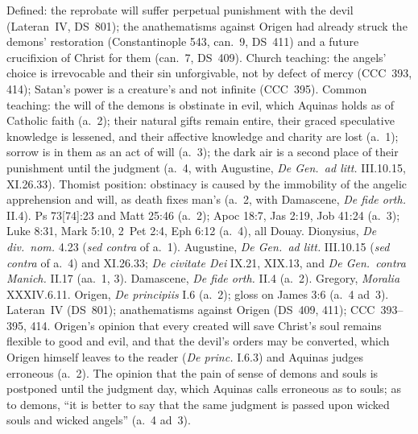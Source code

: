  {Defined: the reprobate will suffer perpetual punishment with the devil
 (Lateran~IV, DS~801); the anathematisms against Origen had already
 struck the demons' restoration (Constantinople 543, can.~9, DS~411) and
 a future crucifixion of Christ for them (can.~7, DS~409). Church
 teaching: the angels' choice is irrevocable and their sin unforgivable,
 not by defect of mercy (CCC~393, 414); Satan's power is a creature's and
 not infinite (CCC~395). Common teaching: the will of the demons is
 obstinate in evil, which Aquinas holds as of Catholic faith (a.~2);
 their natural gifts remain entire, their graced speculative knowledge is
 lessened, and their affective knowledge and charity are lost (a.~1);
 sorrow is in them as an act of will (a.~3); the dark air is a second
 place of their punishment until the judgment (a.~4, with Augustine,
 \emph{De Gen.\ ad litt.} III.10.15, XI.26.33). Thomist position:
 obstinacy is caused by the immobility of the angelic apprehension and
 will, as death fixes man's (a.~2, with Damascene, \emph{De fide orth.}
 II.4).}
 {Ps 73[74]:23 and Matt 25:46 (a.~2); Apoc 18:7, Jas 2:19, Job 41:24
 (a.~3); Luke 8:31, Mark 5:10, 2~Pet 2:4, Eph 6:12 (a.~4), all Douay.
 Dionysius, \emph{De div.\ nom.} 4.23 (\emph{sed contra} of a.~1).
 Augustine, \emph{De Gen.\ ad litt.} III.10.15 (\emph{sed contra} of
 a.~4) and XI.26.33; \emph{De civitate Dei} IX.21, XIX.13, and
 \emph{De Gen.\ contra Manich.} II.17 (aa.~1, 3). Damascene, \emph{De
 fide orth.} II.4 (a.~2). Gregory, \emph{Moralia} XXXIV.6.11. Origen,
 \emph{De principiis} I.6 (a.~2); gloss on James 3:6 (a.~4 ad~3).
 Lateran~IV (DS~801); anathematisms against Origen (DS~409, 411);
 CCC~393--395, 414.}
 {Origen's opinion that every created will save Christ's soul remains
 flexible to good and evil, and that the devil's orders may be
 converted, which Origen himself leaves to the reader (\emph{De princ.}
 I.6.3) and Aquinas judges erroneous (a.~2). The opinion that the pain
 of sense of demons and souls is postponed until the judgment day, which
 Aquinas calls erroneous as to souls; as to demons, ``it is better to
 say that the same judgment is passed upon wicked souls and wicked
 angels'' (a.~4 ad~3).}
